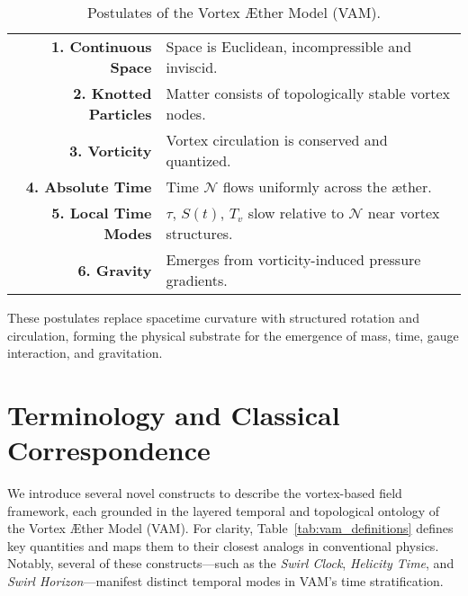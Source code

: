\begin{table}[h!]
    \centering
    \begin{tabular}{rl}
        \hline
        \textbf{1. Continuous Space} & Space is Euclidean, incompressible and inviscid. \\
        \textbf{2. Knotted Particles} & Matter consists of topologically stable vortex nodes. \\
        \textbf{3. Vorticity} & Vortex circulation is conserved and quantized. \\
        \textbf{4. Absolute Time} & Time $\mathcal{N}$ flows uniformly across the æther. \\
        \textbf{5. Local Time Modes} & $\tau$, $S(t)$, $T_v$ slow relative to $\mathcal{N}$ near vortex structures. \\
        \textbf{6. Gravity} & Emerges from vorticity-induced pressure gradients. \\
        \hline
    \end{tabular}
    \caption{Postulates of the Vortex Æther Model (VAM).}
    \label{tab:postulates}
\end{table}

\noindent These postulates replace spacetime curvature with structured rotation and circulation, forming the physical substrate for the emergence of mass, time, gauge interaction, and gravitation.

\section*{Terminology and Classical Correspondence}

We introduce several novel constructs to describe the vortex-based field framework, each grounded in the layered temporal and topological ontology of the Vortex Æther Model (VAM). For clarity, Table~\ref{tab:vam_definitions} defines key quantities and maps them to their closest analogs in conventional physics. Notably, several of these constructs—such as the \emph{Swirl Clock}, \emph{Helicity Time}, and \emph{Swirl Horizon}—manifest distinct temporal modes in VAM’s time stratification.

